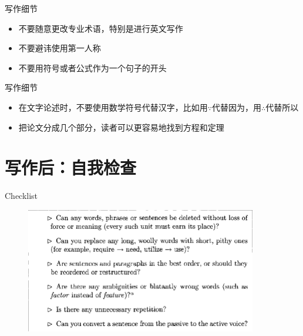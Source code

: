 \documentclass[UTF8]{ctexbeamer}
\begin{document}
\begin{frame}{写作细节}
    \begin{itemize}
        \item 不要随意更改专业术语，特别是进行英文写作
        \item 不要避讳使用第一人称
        \item 不要用符号或者公式作为一个句子的开头\par
        \par
    \end{itemize}
\end{frame}

\begin{frame}{写作细节}
\begin{itemize}
    \item 在文字论述时，不要使用数学符号代替汉字，比如用$\because$代替因为，用$\therefore$代替所以
    \item 把论文分成几个部分，读者可以更容易地找到方程和定理\par
    \par
\end{itemize}
\end{frame}

\section{写作后：自我检查}
\begin{frame}{Checklist}
    \begin{figure}
        \centering
        \includegraphics[width=0.9\textwidth]{figure/Figure 7_1_1.png}
        \label{fig:my_label}
    \end{figure}
\end{frame}
\end{document}
